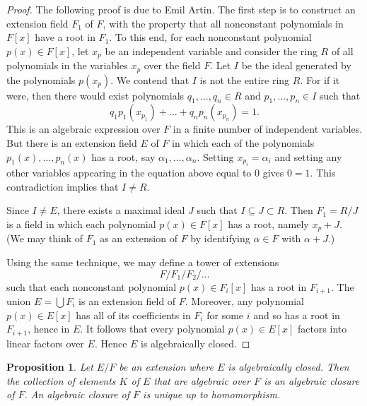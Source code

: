 \documentclass[draft]{article}
\newtheorem{prop}[thm]{Proposition}
\theoremstyle{definition}
\theoremstyle{remark}
\begin{document}
            \begin{proof}
                The following proof is due to Emil Artin. The first step is to construct an extension field $F_1$ of $F$, with the property that all nonconstant polynomials in $F[x]$ have a root in $F_1$. To this end, for each nonconstant polynomial $p(x) \in F[x]$, let $x_p$ be an independent variable and consider the ring $R$ of all polynomials in the variables $x_p$ over the field $F$. Let $I$ be the ideal generated by the polynomials $p(x_p)$. We contend that $I$ is not the entire ring $R$. For if it were, then there would exist polynomials $q_1, \dots, q_n \in R$ and $p_1, \dots, p_n \in I$ such that
                \begin{equation*}
                    q_1p_1(x_{p_1}) + \dots + q_np_n(x_{p_n}) = 1.
                \end{equation*}
                This is an algebraic expression over $F$ in a finite number of independent variables. But there is an extension field $E$ of $F$ in which each of the polynomials $p_1(x), \dots, p_n(x)$ has a root, say $\alpha_1, \dots, \alpha_n$. Setting $x_{p_i} = \alpha_i$ and setting any other variables appearing in the equation above equal to $0$ gives $0 = 1$. This contradiction implies that $I \neq R$.\par
                Since $I \neq E$, there exists a maximal ideal $J$ such that $I \subseteq J \subset R$. Then $F_1 = R / J$ is a field in which each polynomial $p(x) \in F[x]$ has a root, namely $x_p + J$. (We may think of $F_1$ as an extension of $F$ by identifying $\alpha \in F$ with $\alpha + J$.)\par
                Using the same technique, we may define a tower of extensions
                \begin{equation*}
                    F / F_1 / F_2 / \dots
                \end{equation*}
                such that each nonconstant polynomial $p(x) \in F_i[x]$ has a root in $F_{i + 1}$. The union $E = \bigcup F_i$ is an extension field of $F$. Moreover, any polynomial $p(x) \in E[x]$ has all of its coefficients in $F_i$ for some $i$ and so has a root in $F_{i + 1}$, hence in $E$. It follows that every polynomial $p(x) \in E[x]$ factors into linear factors over $E$. Hence $E$ is algebraically closed.
                
            \end{proof}
            
            \begin{prop}
                Let $E/F$ be an extension where $E$ is algebraically closed. Then the collection of elements $K$ of $E$ that are algebraic over $F$ is an algebraic closure of $F$. An algebraic closure of $F$ is unique up to homomorphism.
            \end{prop}
            
\end{document}
